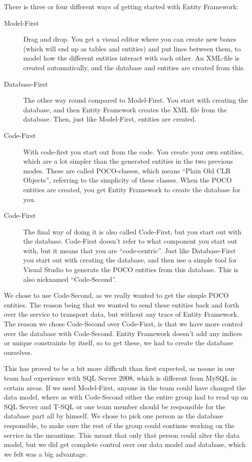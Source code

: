 There is three or four different ways of getting started with Entity Framework:

\begin{description}
\item[Model-First] Drag and drop. You get a visual editor where you can create new boxes (which will end up as tables and entities) and put lines between them, to model how the different entities interact with each other. An XML-file is created automatically, and the database and entities are created from this.
\item[Database-First] The other way round compared to Model-First. You start with creating the database, and then Entity Framework creates the XML file from the database. Then, just like Model-First, entities are created.
\item[Code-First] With code-first you start out from the code. You create your own entities, which are a lot simpler than the generated entities in the two previous modes. These are called POCO-classes, which means ``Plain Old CLR Objects'', referring to the simplicity of these classes. When the POCO entities are created, you get Entity Framework to create the database for you.
\item[Code-First] The final way of doing it is also called Code-First, but you start out with the database. Code-First doesn't refer to what component you start out with, but it means that you are ``code-centric''. Just like Database-First you start out with creating the database, and then use a simple tool for Visual Studio to generate the POCO entities from this database. This is also nicknamed ``Code-Second''.
\end{description}

We chose to use Code-Second, as we really wanted to get the simple POCO entities. The reason being that we wanted to send these entities back and forth over the service to transport data, but without any trace of Entity Framework. The reason we chose Code-Second over Code-First, is that we have more control over the database with Code-Second. Entity Framework doesn't add any indices or unique constraints by itself, so to get these, we had to create the database ourselves.

This has proved to be a bit more difficult than first expected, as noone in our team had experience with SQL Server 2008, which is different from MySQL in certain areas. If we used Model-First, anyone in the team could have changed the data model, where as with Code-Second either the entire group had to read up on SQL Server and T-SQL or one team member should be responsible for the database part all by himself. We chose to pick one person as the database responsible, to make sure the rest of the group could continue working on the service in the meantime. This meant that only that person could alter the data model, but we did get complete control over our data model and database, which we felt was a big advantage.